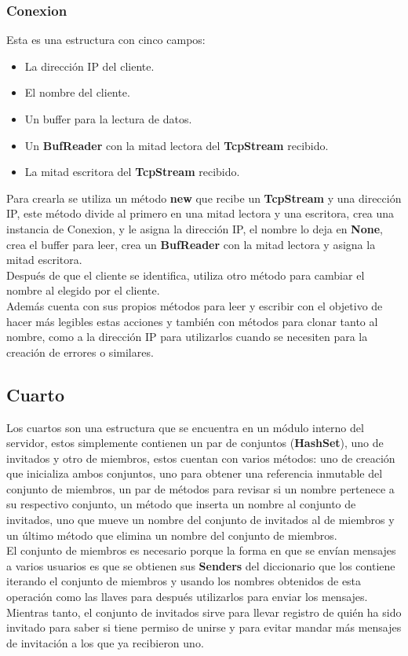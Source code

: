 \documentclass[11pt]{article}
\begin{document}
\subsubsection{Conexion}
Esta es una estructura con cinco campos:
\begin{itemize}
    \item La dirección IP del cliente.
    \item El nombre del cliente.
    \item Un buffer para la lectura de datos.
    \item Un \textbf{BufReader} con la mitad lectora del \textbf{TcpStream} recibido.
    \item La mitad escritora del \textbf{TcpStream} recibido.
\end{itemize}
Para crearla se utiliza un método \textbf{new} que recibe un \textbf{TcpStream} y una dirección IP, este método divide al primero en una mitad lectora y una escritora, crea una instancia de Conexion, y le asigna la dirección IP, el nombre lo deja en \textbf{None}, crea el buffer para leer, crea un \textbf{BufReader} con la mitad lectora y asigna la mitad escritora.\\
Después de que el cliente se identifica, utiliza otro método para cambiar el nombre al elegido por el cliente.\\
Además cuenta con sus propios métodos para leer y escribir con el objetivo de hacer más legibles estas acciones y también con métodos para clonar tanto al nombre, como a la dirección IP para utilizarlos cuando se necesiten para la creación de errores o similares.

\subsection{Cuarto}
Los cuartos son una estructura que se encuentra en un módulo interno del servidor, estos simplemente contienen un par de conjuntos (\textbf{HashSet}), uno de invitados y otro de miembros, estos cuentan con varios métodos: uno de creación que inicializa ambos conjuntos, uno para obtener una referencia inmutable del conjunto de miembros, un par de métodos para revisar si un nombre pertenece a su respectivo conjunto, un método que inserta un nombre al conjunto de invitados, uno que mueve un nombre del conjunto de invitados al de miembros y un último método que elimina un nombre del conjunto de miembros.\\
El conjunto de miembros es necesario porque la forma en que se envían mensajes a varios usuarios es que se obtienen sus \textbf{Senders} del diccionario que los contiene iterando el conjunto de miembros y usando los nombres obtenidos de esta operación como las llaves para después utilizarlos para enviar los mensajes.\\
Mientras tanto, el conjunto de invitados sirve para llevar registro de quién ha sido invitado para saber si tiene permiso de unirse y para evitar mandar más mensajes de invitación a los que ya recibieron uno.
\end{document}
